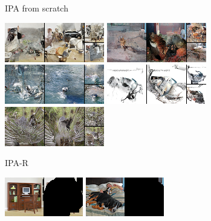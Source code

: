 \begin{figure}[t]
\begin{subfigure}[t]{0.2\textwidth}
      \caption{IPA from scratch}
    \end{subfigure}
    \begin{subfigure}[t]{0.2\textwidth}
      \centering
      \includegraphics[height=\imagenetimgheight]{figs/cigcvae/image-samples/imagenet64/freeform_aipo-r_0_samples.png}
      \includegraphics[height=\imagenetimgheight]{figs/cigcvae/image-samples/imagenet64/freeform_aipo-r_1_samples.png}
      \includegraphics[height=\imagenetimgheight]{figs/cigcvae/image-samples/imagenet64/freeform_aipo-r_2_samples.png}
      \includegraphics[height=\imagenetimgheight]{figs/cigcvae/image-samples/imagenet64/freeform_aipo-r_3_samples.png}
      \includegraphics[height=\imagenetimgheight]{figs/cigcvae/image-samples/imagenet64/freeform_aipo-r_4_samples.png}
      \caption{IPA-R}
    \end{subfigure}
    \begin{subfigure}[t]{0.15\textwidth}
      \centering
      \includegraphics[height=\imagenetimgheight]{figs/cigcvae/image-samples/imagenet64/freeform_aipo_0_gt_masked.png}
      \includegraphics[height=\imagenetimgheight]{figs/cigcvae/image-samples/imagenet64/freeform_aipo_1_gt_masked.png}

\end{subfigure}
\end{figure}

